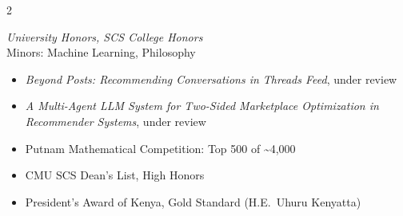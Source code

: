 \documentclass[10pt,a4paper,ragged2e,withhyper]{altacv}
\begin{document}
\begin{paracol}{2}
\medskip

\switchcolumn


\textit{University Honors, SCS College Honors} \\
Minors: Machine Learning, Philosophy

\bigskip
{}

\begin{itemize}
\item \textit{Beyond Posts: Recommending Conversations in Threads Feed}, under review
\item \textit{A Multi-Agent LLM System for Two-Sided Marketplace Optimization in Recommender Systems}, under review
\end{itemize}
\vspace{-0.25\baselineskip}

\bigskip
{}


\smallskip\smallskip
{}

\smallskip\smallskip
{}

\bigskip
{}

\begin{itemize}
\item Putnam Mathematical Competition: Top 500 of \textasciitilde4{,}000
\item CMU SCS Dean's List, High Honors
\item President's Award of Kenya, Gold Standard (H.E.\ Uhuru Kenyatta)
\end{itemize}

\end{paracol}
\end{document}
